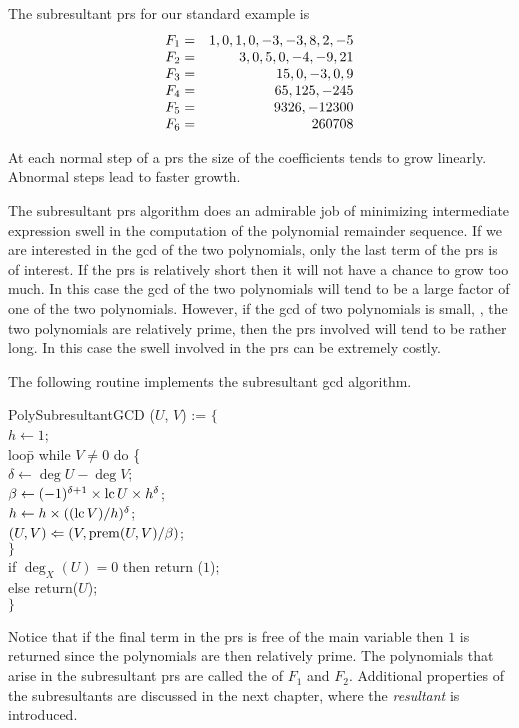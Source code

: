 The subresultant {\sc prs} for our standard example is
\[
\begin{array}[15pt]{lr}
  F_{1}=&1, 0, 1, 0, -3, -3, 8, 2, -5\\
  F_{2}=&3, 0, 5, 0, -4, -9, 21\\
  F_{3}=&15, 0, -3, 0, 9\\
  F_{4}=&65, 125, -245\\
  F_{5}=&9326, -12300\\
  F_{6}=&260708
\end{array}
\]

At each normal step of a {\sc prs} the size of the coefficients tends
to grow linearly.  Abnormal steps lead to faster growth.

The subresultant {\sc prs} algorithm does an admirable job of
minimizing intermediate expression swell in the computation of the
polynomial remainder sequence.  If we are interested in the {\sc gcd}
of the two polynomials, only the last term of the {\sc prs} is of
interest.  If the {\sc prs} is relatively short then it will not have
a chance to grow too much.  In this case the {\sc gcd} of the two
polynomials will tend to be a large factor of one of the two
polynomials.  However, if the {\sc gcd} of two polynomials is small,
\eg, the two polynomials are relatively prime, then the {\sc prs}
involved will tend to be rather long.  In this case the swell involved in
the {\sc prs} can be extremely costly.

The following routine implements the subresultant {\sc gcd} algorithm.

\begindsacode
PolySubresultantGCD ($U$, $V$) := $\{$\\
\> $h \leftarrow 1$; \\
\> loo\=p while $V \not= 0$ do \{ \\
\> \> $\delta \leftarrow \deg U - \deg V$; \\
\> \> $\beta \leftarrow (-1)^{\delta+1} \times \mathop{\rm lc}\nolimits U \times h^{\delta}$; \\
\> \> $h \leftarrow h \times ((\mathop{\rm lc}\nolimits V)/h)^{\delta}$; \\
\> \> $(U, V) \Leftarrow (V, \mathop{\rm prem}\nolimits (U, V)/\beta)$; \\
\> \> $\}$ \\
\> if $\deg_X(U) = 0$ then return ($1$); \\
\>\> else return($U$); \\
\> $\}$
\enddsacode 

\noindent
Notice that if the final term in the {\sc prs} is free of the main
variable then $1$ is returned since the polynomials are then
relatively prime.  The polynomials that arise in the subresultant {\sc
prs} are called the  of $F_1$ and $F_2$.  Additional
properties of the subresultants are discussed in the next chapter,
where the {\em resultant} is introduced.

